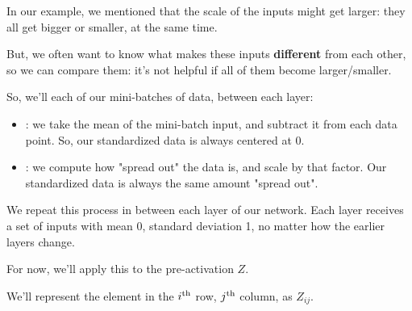             In our example, we mentioned that the scale of the inputs might get larger: they all get bigger or smaller, at the same time.

            But, we often want to know what makes these inputs \textbf{different} from each other, so we can compare them: it's not helpful if all of them become larger/smaller.

            So, we'll  each of our mini-batches of data, between each layer:

            \begin{itemize}
                \item {}: we take the mean of the mini-batch input, and subtract it from each data point. So, our standardized data is always centered at 0.

                \item {}: we compute how "spread out" the data is, and scale by that factor. Our standardized data is always the same amount "spread out".
            \end{itemize}

            We repeat this process in between each layer of our network. Each layer receives a set of inputs with mean 0, standard deviation 1, no matter how the earlier layers change.

            For now, we'll apply this to the pre-activation $Z$.\\

            \begin{notation}
                We'll represent the element in the $i^{ \text{th} }$ row, $j^{ \text{th} }$ column, as $Z_{ij}.$
            \end{notation}

            \phantom{}


